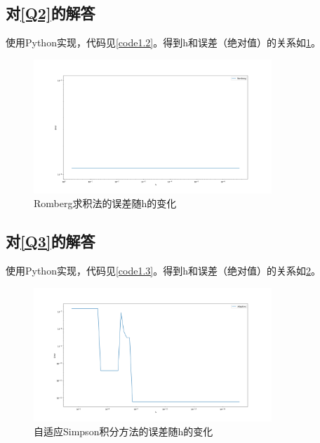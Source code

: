\documentclass[a4paper,11pt,notitlepage]{article}
\begin{document}
\subsection{对\ref{Q2}的解答}
使用Python实现，代码见\cref{code1.2}。得到h和误差（绝对值）的关系如\cref{pic:2}。
\begin{figure}[H]
    \centering
    \includegraphics[width=0.8\textwidth]{../picture/Fifth_Chapter_1B.png}
    \caption{Romberg求积法的误差随h的变化}
    \label{pic:2}
\end{figure}

\subsection{对\ref{Q3}的解答}
使用Python实现，代码见\cref{code1.3}。得到h和误差（绝对值）的关系如\cref{pic:3}。
\begin{figure}[H]
    \centering
    \includegraphics[width=0.8\textwidth]{../picture/Fifth_Chapter_1C.png}
    \caption{自适应Simpson积分方法的误差随h的变化}
    \label{pic:3}
\end{figure}
\end{document}
